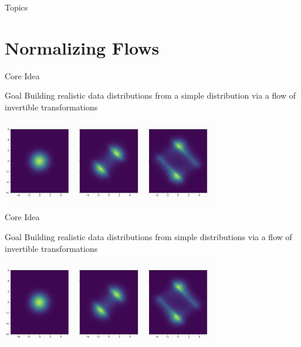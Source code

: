 \documentclass[aspectratio=169,xcolor=dvipsnames]{beamer}
\begin{document}
\begin{frame}[plain]
  \titlepage
\end{frame}

\begin{frame}[plain]{Topics}
  \tableofcontents
\end{frame}

\section{Normalizing Flows}


\begin{frame}{Core Idea}
  \begin{block}{Goal}
    Building realistic data distributions from a simple distribution via a flow of invertible transformations
  \end{block}
  
  \vspace{0.3}
  
  \begin{center}
    \includegraphics[width=0.7\textwidth]{pictures/nf_illustration}
  \end{center}
\end{frame} 

\begin{frame}{Core Idea}
  \begin{block}{Goal}
    Building realistic data distributions from simple distributions via a flow of invertible transformations
  \end{block}
  
  \vspace{0.3}
  
  \begin{center}
    \includegraphics[width=0.7\textwidth]{pictures/nf_illustration}
  \end{center}
  
\end{frame}
\end{document}
